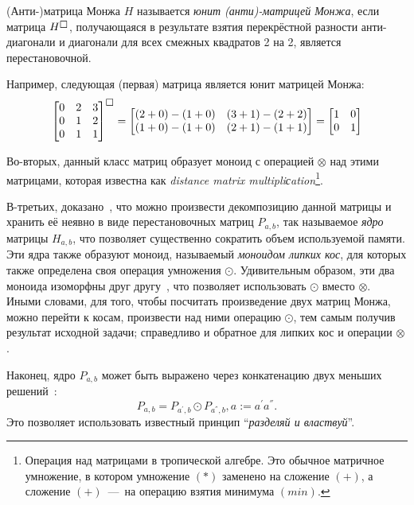 \begin{definition}(Анти-)матрица Монжа $H$ называется \emph{юнит (анти)-матрицей Монжа}, если матрица \todo{(-)}$H^{\msquare}$, получающаяся в результате взятия перекрёстной разности анти-диагонали и диагонали для всех смежных квадратов 2 на 2, является перестановочной.
\end{definition}
Например, следующая (первая) матрица является юнит матрицей Монжа:
\begin{equation}
\begin{bmatrix}
0 & 2 & 3 \\
0 & 1 & 2 \\
0 & 1 & 1
\end{bmatrix} ^ { \msquare} =
\begin{bmatrix}
(2 + 0) - (1 + 0)  & (3 + 1) - (2 + 2)  \\
(1 + 0) - (1 + 0) &  (2 + 1) - (1 + 1) 
\end{bmatrix} = 
\begin{bmatrix}
1 & 0  \\
0 & 1 
\end{bmatrix} 
\end{equation}

Во-вторых, данный класс матриц образует моноид с операцией $\otimes$ над этими матрицами, которая известна как \emph{distance matrix multipliсation}\footnote{Операция над матрицами в тропической алгебре. Это обычное матричное умножение, в котором умножение $(*)$ заменено на сложение $(+)$, а сложение $(+)$~---~на операцию взятия минимума $(min)$.}.

В-третьих, доказано~\cite{tiskin2006all}, что можно произвести декомпозицию данной матрицы и хранить её неявно в виде перестановочных матриц $P_{a,b}$, так называемое \emph{ядро} матрицы $H_{a,b}$, что позволяет существенно сократить объем используемой памяти.
Эти ядра также образуют моноид, называемый \emph{моноидом липких кос}, для которых также определена своя операция умножения $\odot$.
Удивительным образом, эти два моноида изоморфны друг другу~\cite{tiskin2006all}, что позволяет использовать $\odot$ вместо $\otimes$. 
Иными словами, для того, чтобы посчитать произведение двух матриц Монжа, можно перейти к косам, произвести над ними операцию $\odot$, тем самым получив результат исходной задачи; справедливо и обратное для липких кос и операции $\otimes$.
    
Наконец, ядро $P_{a,b}$ может быть выражено через конкатенацию двух меньших решений~\cite{tiskin2006all}:
\begin{equation}\label{formulaKernelCompistion}
P_{a,b}  = P_{a^{'},b} \odot P_{a^{''},b}, a  := a^{'}a^{''}.
\end{equation}
Это позволяет использовать известный принцип ``\emph{разделяй и властвуй}''.

